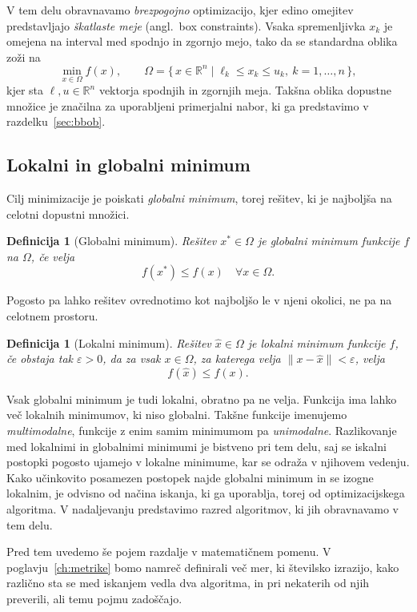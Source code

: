 \documentclass[a4paper, 12pt]{book}
\newtheorem{definicija}[izrek]{Definicija}
\begin{document}
V tem delu obravnavamo \emph{brezpogojno} optimizacijo, kjer edino omejitev
predstavljajo \emph{škatlaste meje} (angl.\ box constraints). Vsaka
spremenljivka $x_k$ je omejena na interval med spodnjo in zgornjo mejo, tako da
se standardna oblika zoži na
\[
    \min_{x \in \Omega} f(x), \qquad
    \Omega = \{\, x \in \mathbb{R}^n \mid \ell_k \le x_k \le u_k,\ k = 1,\dots,n \,\},
\]
kjer sta $\ell, u \in \mathbb{R}^n$ vektorja spodnjih in zgornjih meja. Takšna
oblika dopustne množice je značilna za uporabljeni primerjalni nabor, ki ga
predstavimo v razdelku~\ref{sec:bbob}.


\subsection{Lokalni in globalni minimum}

Cilj minimizacije je poiskati \emph{globalni minimum}, torej rešitev, ki je
najboljša na celotni dopustni množici.

\begin{definicija}[Globalni minimum]
Rešitev $x^{*} \in \Omega$ je globalni minimum funkcije $f$ na
$\Omega$, če velja
\[
    f(x^{*}) \le f(x) \quad \forall x \in \Omega.
\]
\end{definicija}

Pogosto pa lahko rešitev ovrednotimo kot najboljšo le v njeni okolici, ne pa
na celotnem prostoru.

\begin{definicija}[Lokalni minimum]
Rešitev $\hat{x} \in \Omega$ je lokalni minimum funkcije $f$, če
obstaja tak $\varepsilon > 0$, da za vsak $x \in \Omega$, za katerega velja
$\lVert x - \hat{x} \rVert < \varepsilon$, velja
\[
    f(\hat{x}) \le f(x).
\]
\end{definicija}

Vsak globalni minimum je tudi lokalni, obratno pa ne velja. Funkcija ima
lahko več lokalnih minimumov, ki niso globalni. Takšne funkcije imenujemo
\emph{multimodalne}, funkcije z enim samim minimumom pa \emph{unimodalne}.
Razlikovanje med lokalnimi in globalnimi minimumi je bistveno pri tem
delu, saj se iskalni postopki pogosto ujamejo v lokalne minimume, kar se
odraža v njihovem vedenju. Kako učinkovito posamezen postopek najde globalni 
minimum in se izogne lokalnim, je odvisno od načina iskanja, ki ga uporablja, torej od optimizacijskega algoritma. V nadaljevanju predstavimo razred 
algoritmov, ki jih obravnavamo v tem delu.

Pred tem uvedemo še pojem razdalje v matematičnem pomenu. V
poglavju~\ref{ch:metrike} bomo namreč definirali več mer, ki številsko
izrazijo, kako različno sta se med iskanjem vedla dva algoritma, in pri
nekaterih od njih preverili, ali temu pojmu zadoščajo.
\end{document}
